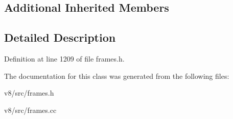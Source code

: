 \subsection*{Additional Inherited Members}


\subsection{Detailed Description}


Definition at line 1209 of file frames.\+h.



The documentation for this class was generated from the following files\+:\begin{DoxyCompactItemize}
\item 
v8/src/frames.\+h\item 
v8/src/frames.\+cc\end{DoxyCompactItemize}
